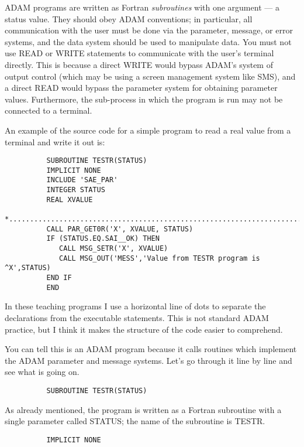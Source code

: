 ADAM programs are written as Fortran {\em subroutines} with one argument --- a
status value.
They should obey ADAM conventions; in particular, all communication
with the user must be done via the parameter, message, or error systems, and
the data system should be used to manipulate data.
You must not use READ or WRITE statements to communicate with the user's
terminal directly.
This is because a direct WRITE would bypass ADAM's system of output control
(which may be using a screen management system like SMS), and a direct READ
would bypass the parameter system for obtaining parameter values.
Furthermore, the sub-process in which the program is run may not be connected to
a terminal.

An example of the source code for a simple program to read a real value from a
terminal and write it out is:

\begin{small}
\begin{verbatim}
          SUBROUTINE TESTR(STATUS)
          IMPLICIT NONE
          INCLUDE 'SAE_PAR'
          INTEGER STATUS
          REAL XVALUE
    *...........................................................................
          CALL PAR_GET0R('X', XVALUE, STATUS)
          IF (STATUS.EQ.SAI__OK) THEN
             CALL MSG_SETR('X', XVALUE)
             CALL MSG_OUT('MESS','Value from TESTR program is ^X',STATUS)
          END IF
          END
\end{verbatim}
\end{small}

In these teaching programs I use a horizontal line of dots to separate the
declarations from the executable statements.
This is not standard ADAM practice, but I think it makes the structure of the
code easier to comprehend.

You can tell this is an ADAM program because it calls routines which implement
the ADAM parameter and message systems.
Let's go through it line by line and see what is going on.

\begin{small}
\begin{verbatim}
          SUBROUTINE TESTR(STATUS)
\end{verbatim}
\end{small}

As already mentioned, the program is written as a Fortran subroutine with a
single parameter called STATUS; the name of the subroutine is TESTR.

\begin{small}
\begin{verbatim}
          IMPLICIT NONE
\end{verbatim}
\end{small}


